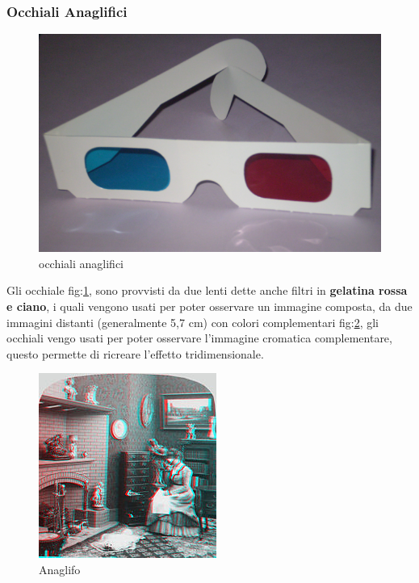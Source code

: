 \documentclass[10pt,a4paper]{article}
\begin{document}
	\subsubsection{Occhiali Anaglifici}
	\begin{figure}[H]
		\centering
		\includegraphics[width=0.6\linewidth]{image/occhiali_anaglifici}
		\caption{occhiali anaglifici}
		\label{fig:occhiali_anaglifici}
	\end{figure}
	Gli occhiale fig:\ref{fig:occhiali_anaglifici}, sono provvisti da due lenti dette anche  filtri in \textbf{gelatina rossa e ciano}, i quali vengono usati per poter osservare un immagine composta, da due immagini distanti (generalmente 5,7 cm) con colori complementari fig:\ref{fig:anaglifo}, gli occhiali vengo usati per poter osservare l'immagine cromatica complementare, questo permette di ricreare l'effetto tridimensionale.
	 \begin{figure}[H]
	 	\centering
	 	\includegraphics[width=0.6\linewidth]{image/anaglifo}
	 	\caption{Anaglifo }
	 	\label{fig:anaglifo}
	 \end{figure}
 \newpage
\end{document}
